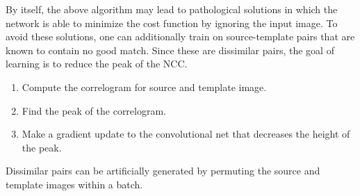\documentclass{article}
\begin{document}
By itself, the above algorithm may lead to pathological solutions in which the network is able to minimize the cost function by ignoring the input image. To avoid these solutions, one can additionally train on source-template pairs that are known to contain no good match. Since these are dissimilar pairs, the goal of learning is to reduce the peak of the NCC.
\begin{enumerate}
\item Compute the correlogram for source and template image. 
\item Find the peak of the correlogram. 
\item Make a gradient update to the convolutional net that decreases the height of the peak. 
\end{enumerate}
Dissimilar pairs can be artificially generated by permuting the source and template images within a batch. 


\label{gen_inst}



 
\end{document}
